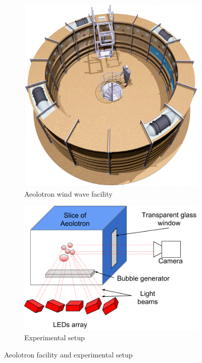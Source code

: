 		\begin{figure}
			\centering
			\begin{subfigure}[t]{.4\linewidth}
				\centering
				\includegraphics[scale=0.15]{images/aeolotron-gesamt.png}
				\caption{Aeolotron wind wave facility}
			\end{subfigure}
			\begin{subfigure}[t]{.4\linewidth}		
				\centering
				\includegraphics[scale=.5]{images/aeolotron_setup.png}
				\caption{Experimental setup}
			\end{subfigure}
			
			\caption{Aeolotron facility and experimental setup}
			\label{fig:aeolotron_setup}
		\end{figure}
	
